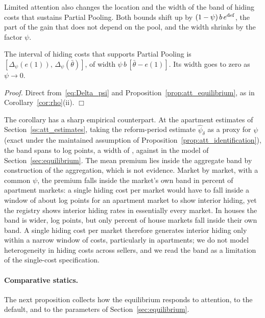 Limited attention also changes the location and the width of the band of hiding costs that sustains Partial Pooling. Both bounds shift up by $(1-\psi)\,b\,e^{\rm def}$, the part of the gain that does not depend on the pool, and the width shrinks by the factor $\psi$.

\begin{corollary}
\label{cor:att_band}
The interval of hiding costs that supports Partial Pooling is $[\Delta_\psi(e(1)),\,\Delta_\psi(\bar\theta)]$, of width $\psi\,b\,[\bar\theta-e(1)]$. Its width goes to zero as $\psi\to0$.
\end{corollary}

\noindent\textit{Proof.} Direct from~\eqref{eq:Delta_psi} and Proposition~\ref{prop:att_equilibrium}, as in Corollary~\ref{cor:rho}(ii). $\Box$

The corollary has a sharp empirical counterpart. At the apartment estimates of Section~\ref{ss:att_estimates}, taking the reform-period estimate $\hat\psi_\delta$ as a proxy for $\psi$ (exact under the maintained assumption of Proposition~\ref{prop:att_identification}), the band spans \attBandLoApt{} to \attBandHiApt{} log points, a width of \attBandWidthApt{}, against \attBandWidthBaseApt{} in the model of Section~\ref{sec:equilibrium}. The mean premium lies inside the aggregate band by construction of the aggregation, which is not evidence. Market by market, with a common $\psi$, the premium falls inside the market's own band in \attShareInBandApt{} percent of apartment markets: a single hiding cost per market would have to fall inside a window of about \attBandWidthApt{} log points for an apartment market to show interior hiding, yet the registry shows interior hiding rates in essentially every market. In houses the band is wider, \attBandWidthHouse{} log points, but only \attShareInBandHouse{} percent of house markets fall inside their own band. A single hiding cost per market therefore generates interior hiding only within a narrow window of costs, particularly in apartments; we do not model heterogeneity in hiding costs across sellers, and we read the band as a limitation of the single-cost specification.

\paragraph{Comparative statics.}
The next proposition collects how the equilibrium responds to attention, to the default, and to the parameters of Section~\ref{sec:equilibrium}.

